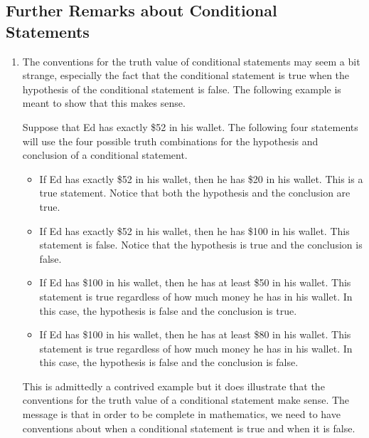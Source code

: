 \subsection*{Further Remarks about Conditional Statements}
\begin{enumerate}
\item The conventions for the truth value of conditional statements may seem a bit strange, especially the fact that the conditional statement is true when the hypothesis of the conditional statement is false.  The following example is meant to show that this makes sense.

Suppose that Ed has exactly \$52 in his wallet.  The following four statements will use the four possible truth combinations for the hypothesis and conclusion of a conditional statement.
\begin{itemize}
  \item If Ed has exactly \$52 in his wallet, then he has \$20 in his wallet.  This is a true statement.  Notice that both the hypothesis and the conclusion are true.
  \item If Ed has exactly \$52 in his wallet, then he has \$100 in his wallet.  This statement is false.  Notice that the hypothesis is true and the conclusion is false.
  \item If Ed has \$100 in his wallet, then he has at least  \$50 in his wallet.  This statement is true regardless of how much money he has in his wallet.  In this case, the hypothesis is false and the conclusion is true.
  \item If Ed has \$100 in his wallet, then he has at least  \$80 in his wallet.  This statement is true regardless of how much money he has in his wallet.  In this case, the hypothesis is false and the conclusion is false.
\end{itemize}
This is admittedly a contrived example but it does illustrate that the conventions for the truth value of a conditional statement make sense.  The message is that in order to be complete in mathematics, we need to have conventions about when a conditional statement is true and when it is false.  %


\end{enumerate}
